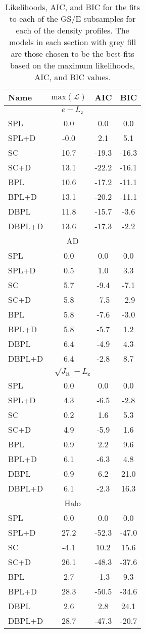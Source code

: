 \begin{table}
\centering
\small
\caption{Likelihoods, AIC, and BIC for the fits to each of the GS/E subsamples for each of the density profiles. The models in each section with grey fill are those chosen to be the best-fits based on the maximum likelihoods, AIC, and BIC values.}
\label{ch3:tab:likelihood}
\begin{tabular}{lccc}

\hline 
Name & $\mathrm{max}(\mathcal{L})$ & AIC & BIC \\ 
\hline 
\multicolumn{4}{c}{$e-L_\mathrm{z}$} \\ 
\hline 
SPL & 0.0 & 0.0 & 0.0 \\ 
SPL+D & -0.0 & 2.1 & 5.1 \\ 
SC & 10.7 & -19.3 & -16.3 \\ 
\rowcolor{lightgray} SC+D & 13.1 & -22.2 & -16.1 \\ 
BPL & 10.6 & -17.2 & -11.1 \\ 
BPL+D & 13.1 & -20.2 & -11.1 \\ 
DBPL & 11.8 & -15.7 & -3.6 \\ 
DBPL+D & 13.6 & -17.3 & -2.2 \\ 
\hline 
\multicolumn{4}{c}{AD} \\ 
\hline 
SPL & 0.0 & 0.0 & 0.0 \\ 
SPL+D & 0.5 & 1.0 & 3.3 \\ 
\rowcolor{lightgray} SC & 5.7 & -9.4 & -7.1 \\ 
SC+D & 5.8 & -7.5 & -2.9 \\ 
BPL & 5.8 & -7.6 & -3.0 \\ 
BPL+D & 5.8 & -5.7 & 1.2 \\ 
DBPL & 6.4 & -4.9 & 4.3 \\ 
DBPL+D & 6.4 & -2.8 & 8.7 \\ 
\hline 
\multicolumn{4}{c}{$\sqrt{J_\mathrm{R}}-L_\mathrm{z}$} \\ 
\hline 
SPL & 0.0 & 0.0 & 0.0 \\ 
\rowcolor{lightgray} SPL+D & 4.3 & -6.5 & -2.8 \\ 
SC & 0.2 & 1.6 & 5.3 \\ 
SC+D & 4.9 & -5.9 & 1.6 \\ 
BPL & 0.9 & 2.2 & 9.6 \\ 
BPL+D & 6.1 & -6.3 & 4.8 \\ 
DBPL & 0.9 & 6.2 & 21.0 \\ 
DBPL+D & 6.1 & -2.3 & 16.3 \\ 
\hline 
\multicolumn{4}{c}{Halo} \\ 
\hline 
SPL & 0.0 & 0.0 & 0.0 \\ 
\rowcolor{lightgray} SPL+D & 27.2 & -52.3 & -47.0 \\ 
SC & -4.1 & 10.2 & 15.6 \\ 
SC+D & 26.1 & -48.3 & -37.6 \\ 
BPL & 2.7 & -1.3 & 9.3 \\ 
BPL+D & 28.3 & -50.5 & -34.6 \\ 
DBPL & 2.6 & 2.8 & 24.1 \\ 
DBPL+D & 28.7 & -47.3 & -20.7 \\ 
\hline 




\end{tabular}
\end{table}
